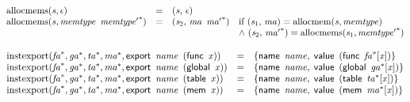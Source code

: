 $$
\begin{array}{@{}lcl@{}l@{}}
{\mathrm{allocmems}}({\mathit{s}}, \epsilon) &=& ({\mathit{s}},\, \epsilon) &  \\
{\mathrm{allocmems}}({\mathit{s}}, {\mathit{memtype}}~\,{{\mathit{memtype}'}^\ast}) &=& ({\mathit{s}}_{{2}},\, {\mathit{ma}}~\,{{\mathit{ma}'}^\ast}) &\quad
  \mbox{if}~({\mathit{s}}_{{1}},\, {\mathit{ma}}) = {\mathrm{allocmem}}({\mathit{s}}, {\mathit{memtype}}) \\
 &&&\quad {\land}~({\mathit{s}}_{{2}},\, {{\mathit{ma}'}^\ast}) = {\mathrm{allocmems}}({\mathit{s}}_{{1}}, {{\mathit{memtype}'}^\ast}) \\
\end{array}
$$

\vspace{1ex}

$$
\begin{array}{@{}lcl@{}l@{}}
{\mathrm{instexport}}({{\mathit{fa}}^\ast}, {{\mathit{ga}}^\ast}, {{\mathit{ta}}^\ast}, {{\mathit{ma}}^\ast}, \mathsf{export}~\,{\mathit{name}}~\,(\mathsf{func}~\,{\mathit{x}})) &=& \{ \begin{array}[t]{@{}l@{}}
\mathsf{name}~\,{\mathit{name}},\; \mathsf{value}~\,(\mathsf{func}~\,{{\mathit{fa}}^\ast}{}[{\mathit{x}}]) \}\end{array} &  \\
{\mathrm{instexport}}({{\mathit{fa}}^\ast}, {{\mathit{ga}}^\ast}, {{\mathit{ta}}^\ast}, {{\mathit{ma}}^\ast}, \mathsf{export}~\,{\mathit{name}}~\,(\mathsf{global}~\,{\mathit{x}})) &=& \{ \begin{array}[t]{@{}l@{}}
\mathsf{name}~\,{\mathit{name}},\; \mathsf{value}~\,(\mathsf{global}~\,{{\mathit{ga}}^\ast}{}[{\mathit{x}}]) \}\end{array} &  \\
{\mathrm{instexport}}({{\mathit{fa}}^\ast}, {{\mathit{ga}}^\ast}, {{\mathit{ta}}^\ast}, {{\mathit{ma}}^\ast}, \mathsf{export}~\,{\mathit{name}}~\,(\mathsf{table}~\,{\mathit{x}})) &=& \{ \begin{array}[t]{@{}l@{}}
\mathsf{name}~\,{\mathit{name}},\; \mathsf{value}~\,(\mathsf{table}~\,{{\mathit{ta}}^\ast}{}[{\mathit{x}}]) \}\end{array} &  \\
{\mathrm{instexport}}({{\mathit{fa}}^\ast}, {{\mathit{ga}}^\ast}, {{\mathit{ta}}^\ast}, {{\mathit{ma}}^\ast}, \mathsf{export}~\,{\mathit{name}}~\,(\mathsf{mem}~\,{\mathit{x}})) &=& \{ \begin{array}[t]{@{}l@{}}
\mathsf{name}~\,{\mathit{name}},\; \mathsf{value}~\,(\mathsf{mem}~\,{{\mathit{ma}}^\ast}{}[{\mathit{x}}]) \}\end{array} &  \\
\end{array}
$$

